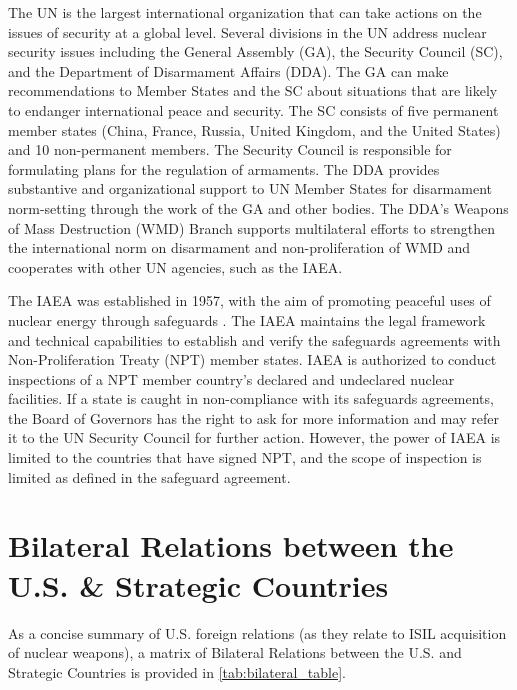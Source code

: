 \documentclass{report}
\begin{document}
The UN is the largest international organization that can take actions on the issues of security at a global level. Several divisions in the UN address nuclear security issues including the General Assembly (GA), the Security Council (SC), and the Department of Disarmament Affairs (DDA). The GA can make recommendations to Member States and the SC about situations that are likely to endanger international peace and security. The SC consists of five permanent member states (China, France, Russia, United Kingdom, and the United States) and 10 non-permanent members. The Security Council is responsible for formulating plans for the regulation of armaments. The DDA provides substantive and organizational support to UN Member States for disarmament norm-setting through the work of the GA and other bodies. The DDA's Weapons of Mass Destruction (WMD) Branch supports multilateral efforts to strengthen the international norm on disarmament and non-proliferation of WMD and cooperates with other UN agencies, such as the IAEA.

The IAEA was established in 1957, with the aim of promoting peaceful uses of nuclear energy through safeguards \cite{InternationalAtomicEnergyAgency}. The IAEA maintains the legal framework and technical capabilities to establish and verify the safeguards agreements with Non-Proliferation Treaty (NPT) member states. IAEA is authorized to conduct inspections of a NPT member country's declared and undeclared nuclear facilities. If a state is caught in non-compliance with its safeguards agreements, the Board of Governors has the right to ask for more information and may refer it to the UN Security Council for further action. However, the power of IAEA is limited to the countries that have signed NPT, and the scope of inspection is limited as defined in the safeguard agreement. 








\chapter[Appendix H: Bilateral Relations between the U.S. \& Strategic Countries]{Bilateral Relations between the U.S. \&  Strategic Countries} \label{app:relations_table}

As a concise summary of U.S. foreign relations (as they relate to ISIL acquisition of nuclear weapons), a matrix of Bilateral Relations between the U.S. and Strategic Countries is provided in \autoref{tab:bilateral_table}.
\end{document}
